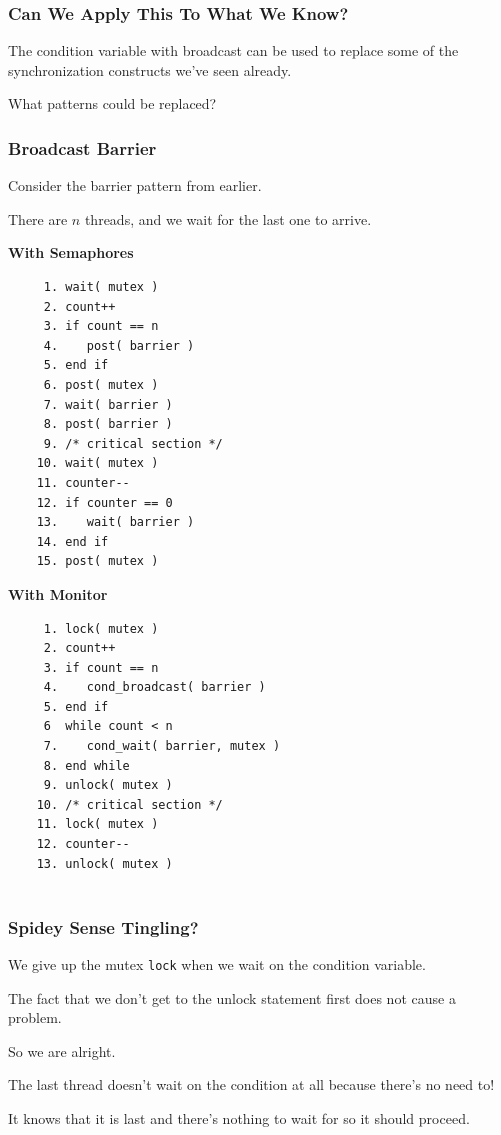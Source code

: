 \begin{frame}
	\frametitle{Can We Apply This To What We Know?}

	The condition variable with broadcast can be used to replace some of the synchronization constructs we've seen already.

	What patterns could be replaced?

\end{frame}

\begin{frame}[fragile]
	\frametitle{Broadcast Barrier}

	Consider the barrier pattern from earlier.

	There are $n$ threads, and we wait for the last one to arrive.
		{\small
			\begin{multicols}{2}
				\textbf{With Semaphores}
				\begin{verbatim}
	 1. wait( mutex )
	 2. count++
	 3. if count == n
	 4.    post( barrier )
	 5. end if
	 6. post( mutex )
	 7. wait( barrier )
	 8. post( barrier )
	 9. /* critical section */
	10. wait( mutex )
	11. counter--
	12. if counter == 0
	13.    wait( barrier )
	14. end if
	15. post( mutex )
  				\end{verbatim}
				\columnbreak
				\textbf{With Monitor}\vspace{-2em}
				\begin{verbatim}
	 1. lock( mutex )
	 2. count++
	 3. if count == n
	 4.    cond_broadcast( barrier )
	 5. end if
	 6  while count < n
	 7.    cond_wait( barrier, mutex )
	 8. end while
	 9. unlock( mutex )
	10. /* critical section */
	11. lock( mutex )
	12. counter--
	13. unlock( mutex )


  				\end{verbatim}
			\end{multicols}
		}


\end{frame}


\begin{frame}
	\frametitle{Spidey Sense Tingling?}


	We give up the mutex \texttt{lock} when we wait on the condition variable.

	The fact that we don't get to the unlock statement first does not cause a problem.

	So we are alright.

	The last thread doesn't wait on the condition at all because there's no need to!

	It knows that it is last and there's nothing to wait for so it should proceed.

\end{frame}


